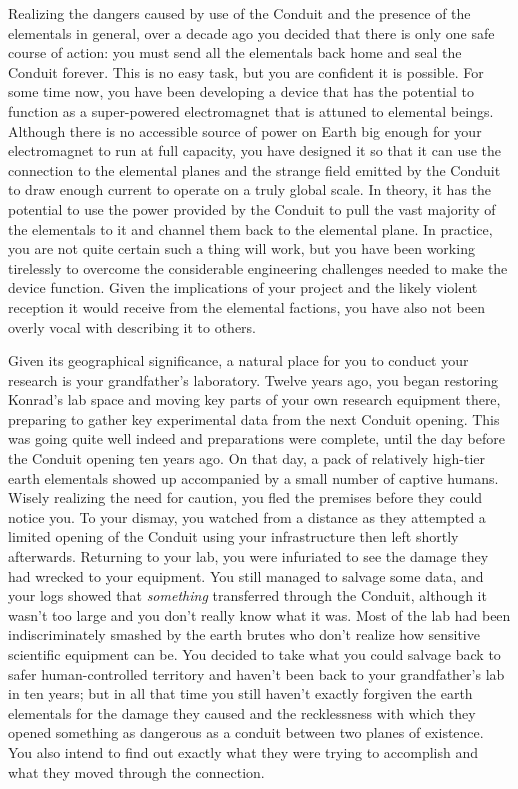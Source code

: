 \documentclass[char]{guildcamp1}
\begin{document}
Realizing the dangers caused by use of the Conduit and the presence of the elementals in general, over a decade ago you decided that there is only one safe course of action: you must send all the elementals back home and seal the Conduit forever. This is no easy task, but you are confident it is possible. For some time now, you have been developing a device that has the potential to function as a super-powered electromagnet that is attuned to elemental beings. Although there is no accessible source of power on Earth big enough for your electromagnet to run at full capacity, you have designed it so that it can use the connection to the elemental planes and the strange field emitted by the Conduit to draw enough current to operate on a truly global scale. In theory, it has the potential to use the power provided by the Conduit to pull the vast majority of the elementals to it and channel them back to the elemental plane. In practice, you are not quite certain such a thing will work, but you have been working tirelessly to overcome the considerable engineering challenges needed to make the device function. Given the implications of your project and the likely violent reception it would receive from the elemental factions, you have also not been overly vocal with describing it to others.

Given its geographical significance, a natural place for you to conduct your research is your grandfather's laboratory. Twelve years ago, you began restoring Konrad's lab space and moving key parts of your own research equipment there, preparing to gather key experimental data from the next Conduit opening. This was going quite well indeed and preparations were complete, until the day before the Conduit opening ten years ago. On that day, a pack of relatively high-tier earth elementals showed up accompanied by a small number of captive humans. Wisely realizing the need for caution, you fled the premises before they could notice you. To your dismay, you watched from a distance as they attempted a limited opening of the Conduit using your infrastructure then left shortly afterwards. Returning to your lab, you were infuriated to see the damage they had wrecked to your equipment. You still managed to salvage some data, and your logs showed that \emph{something} transferred through the Conduit, although it wasn't too large and you don't really know what it was. Most of the lab had been indiscriminately smashed by the earth brutes who don't realize how sensitive scientific equipment can be. You decided to take what you could salvage back to safer human-controlled territory and haven't been back to your grandfather's lab in ten years; but in all that time you still haven't exactly forgiven the earth elementals for the damage they caused and the recklessness with which they opened something as dangerous as a conduit between two planes of existence. You also intend to find out exactly what they were trying to accomplish and what they moved through the connection.
\end{document}
